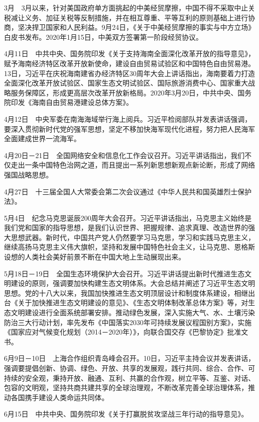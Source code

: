 \documentclass[10pt,a4paper,twocolumn]{book}
\begin{document}
3月　3月以来，针对美国政府单方面挑起的中美经贸摩擦，中国不得不采取中止关税减让义务、加征关税等反制措施，并在相互尊重、平等互利的原则基础上进行协商，坚决捍卫国家和人民利益。9月24日，《关于中美经贸摩擦的事实与中方立场》白皮书发布。2020年1月15日，中美双方签署第一阶段经贸协议。

4月11日　中共中央、国务院印发《关于支持海南全面深化改革开放的指导意见》，赋予海南经济特区改革开放新使命，建设自由贸易试验区和中国特色自由贸易港。13日，习近平在庆祝海南建省办经济特区30周年大会上讲话指出，海南要着力打造全面深化改革开放试验区、国家生态文明试验区、国际旅游消费中心、国家重大战略服务保障区，形成更高层次改革开放新格局。2020年3月20日，中共中央、国务院印发《海南自由贸易港建设总体方案》。

4月12日　中央军委在南海海域举行海上阅兵。习近平检阅部队并发表讲话强调，要深入贯彻新时代党的强军思想，坚定不移加快海军现代化进程，努力把人民海军全面建成世界一流海军。

4月20日－21日　全国网络安全和信息化工作会议召开。习近平讲话指出，我们不仅走出一条中国特色治网之道，而且提出一系列新思想新观点新论断，形成了网络强国战略思想。

4月27日　十三届全国人大常委会第二次会议通过《中华人民共和国英雄烈士保护法》。

5月4日　纪念马克思诞辰200周年大会召开。习近平讲话指出，马克思主义始终是我们党和国家的指导思想，是我们认识世界、把握规律、追求真理、改造世界的强大思想武器。新时代，中国共产党人仍然要学习马克思，学习和实践马克思主义，继续高扬马克思主义伟大旗帜，坚持和发展中国特色社会主义，让马克思、恩格斯设想的人类社会美好前景不断在中国大地上生动展现出来。

5月18日－19日　全国生态环境保护大会召开。习近平讲话提出新时代推进生态文明建设的原则，强调要加快构建生态文明体系。大会总结并阐述了习近平生态文明思想。党的十八大以来，我国加快推进生态文明顶层设计和制度体系建设，相继出台《关于加快推进生态文明建设的意见》、《生态文明体制改革总体方案》等，对生态文明建设进行全面系统部署安排。推动绿色发展，深入实施大气、水、土壤污染防治三大行动计划，率先发布《中国落实2030年可持续发展议程国别方案》，实施《国家应对气候变化规划（2014－2020年）》，向联合国交存《巴黎协定》批准文书。

6月9日－10日　上海合作组织青岛峰会召开。10日，习近平主持会议并发表讲话，强调要提倡创新、协调、绿色、开放、共享的发展观，践行共同、综合、合作、可持续的安全观，秉持开放、融通、互利、共赢的合作观，树立平等、互鉴、对话、包容的文明观，坚持共商共建共享的全球治理观，不断改革完善全球治理体系，推动各国携手建设人类命运共同体。

6月15日　中共中央、国务院印发《关于打赢脱贫攻坚战三年行动的指导意见》。
\end{document}
